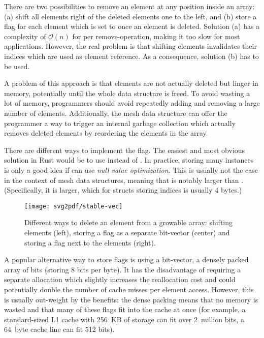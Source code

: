 There are two possibilities to remove an element at any position inside an array: (a) shift all elements right of the deleted elements one to the left, and (b) store a  flag for each element which is set to  once an element is deleted.
Solution (a) has a complexity of $\mathcal O(n)$ for per remove-operation, making it too slow for most applications.
However, the real problem is that shifting elements invalidates their indices which are used as element reference.
As a consequence, solution (b) has to be used.

A problem of this approach is that elements are not actually deleted but linger in memory, potentially until the whole data structure is freed.
To avoid wasting a lot of memory, programmers should avoid repeatedly adding and removing a large number of elements.
Additionally, the mesh data structure can offer the programmer a way to trigger an internal garbage collection which actually removes deleted elements by reordering the elements in the array.

There are different ways to implement the  flag.
The easiest and most obvious solution in Rust would be to use  instead of .
In practice, storing many  instances is only a good idea if  can use \emph{null value optimization}.
This is usually not the case in the context of mesh data structures, meaning that  is notably larger than .
(Specifically, it is  larger, which for structs storing  indices is usually 4 bytes.)

\begin{figure}[ht]
  \vspace{5mm}
  \centering
  \texttt{[image: svg2pdf/stable-vec]}
  \caption{Different ways to delete an element from a growable array: shifting elements (left), storing a  flag as a separate bit-vector (center) and storing a  flag next to the elements (right).}
  \vspace{5mm}
\end{figure}

A popular alternative way to store  flags is using a bit-vector, a densely packed array of bits (storing 8 bits per byte).
It has the disadvantage of requiring a separate allocation which slightly increases the reallocation cost and could potentially double the number of cache misses per element access.
However, this is usually out-weight by the benefits:
the dense packing means that no memory is wasted and that many of these flags fit into the cache at once (for example, a standard-sized L1 cache with 256~KB of storage can fit over 2~million bits, a 64~byte cache line can fit 512 bits).

